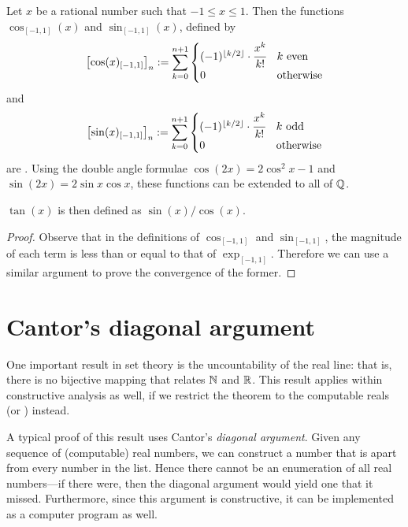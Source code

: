 \documentclass[leqno]{report}
\begin{document}
\begin{Proposition}
    Let $x$ be a rational number such that $-1 \leq x \leq 1$. Then the functions $\cos_{[-1,1]}(x)$ and $\sin_{[-1,1]}(x)$, defined by
    \[
        \left[\cos(x)_{[-1,1]}\right]_n
        := \sum_{k=0}^{n+1} \begin{cases}
            (-1)^{\floor{k/2}} \cdot \cfrac{x^k}{k!} & k\ \mathrm{even} \\
            0 & \mathrm{otherwise}
        \end{cases}
    \]
    and
    \[
        \left[\sin(x)_{[-1,1]}\right]_n
        := \sum_{k=0}^{n+1} \begin{cases}
            (-1)^{\floor{k/2}} \cdot \cfrac{x^k}{k!} & k\ \mathrm{odd} \\
            0 & \mathrm{otherwise}
        \end{cases}
    \]
    are \FCCS. Using the double angle formulae $\cos(2x) = 2 \cos^2 x - 1$ and $\sin(2x) = 2 \sin x \cos x$, these functions can be extended to all of $\mathbb{Q}$.

    $\tan(x)$ is then defined as $\sin(x) / \cos(x)$.
\end{Proposition}

\begin{proof}
    Observe that in the definitions of $\cos_{[-1,1]}$ and $\sin_{[-1,1]}$, the magnitude of each term is less than or equal to that of $\exp_{[-1,1]}$. Therefore we can use a similar argument to prove the convergence of the former.
\end{proof}

\section{Cantor's diagonal argument}

One important result in set theory is the uncountability of the real line: that is, there is no bijective mapping that relates $\mathbb{N}$ and $\mathbb{R}$. This result applies within constructive analysis as well, if we restrict the theorem to the computable reals (or \FCCS) instead.

A typical proof of this result uses Cantor's \textit{diagonal argument}. Given any sequence of (computable) real numbers, we can construct a number that is apart from every number in the list. Hence there cannot be an enumeration of all real numbers---if there were, then the diagonal argument would yield one that it missed. Furthermore, since this argument is constructive, it can be implemented as a computer program as well.
\end{document}

